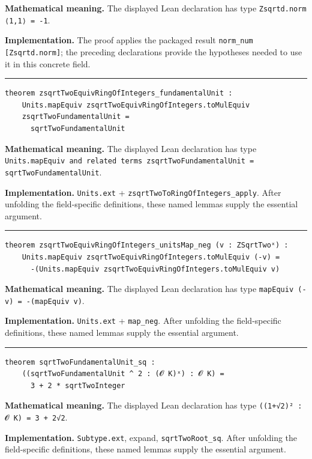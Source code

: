 \documentclass[UTF8,a4paper,11pt,fontset=fandol]{ctexart}
\theoremstyle{definition}
\newcommand{\statementsep}{\par\medskip\hrule\medskip}
\begin{document}
\noindent\textbf{Mathematical meaning.} The displayed Lean declaration has type \texttt{Zsqrtd.\allowbreak{}norm ⟨1,1⟩ = -1}.\par
\noindent\textbf{Implementation.} The proof applies the packaged result \texttt{norm\_\allowbreak{}num [Zsqrtd.\allowbreak{}norm]}; the preceding declarations provide the hypotheses needed to use it in this concrete field.\par
\statementsep
\begin{verbatim}
theorem zsqrtTwoEquivRingOfIntegers_fundamentalUnit :
    Units.mapEquiv zsqrtTwoEquivRingOfIntegers.toMulEquiv
    zsqrtTwoFundamentalUnit =
      sqrtTwoFundamentalUnit
\end{verbatim}
\noindent\textbf{Mathematical meaning.} The displayed Lean declaration has type \texttt{Units.\allowbreak{}mapEquiv and related terms zsqrtTwoFundamentalUnit = sqrtTwoFundamentalUnit}.\par
\noindent\textbf{Implementation.} \texttt{Units.\allowbreak{}ext} + \texttt{zsqrtTwoToRingOfIntegers\_\allowbreak{}apply}. After unfolding the field-specific definitions, these named lemmas supply the essential argument.\par
\statementsep
\begin{verbatim}
theorem zsqrtTwoEquivRingOfIntegers_unitsMap_neg (v : ZSqrtTwoˣ) :
    Units.mapEquiv zsqrtTwoEquivRingOfIntegers.toMulEquiv (-v) =
      -(Units.mapEquiv zsqrtTwoEquivRingOfIntegers.toMulEquiv v)
\end{verbatim}
\noindent\textbf{Mathematical meaning.} The displayed Lean declaration has type \texttt{mapEquiv (-v) = -(mapEquiv v)}.\par
\noindent\textbf{Implementation.} \texttt{Units.\allowbreak{}ext} + \texttt{map\_\allowbreak{}neg}. After unfolding the field-specific definitions, these named lemmas supply the essential argument.\par
\statementsep
\begin{verbatim}
theorem sqrtTwoFundamentalUnit_sq :
    ((sqrtTwoFundamentalUnit ^ 2 : (𝓞 K)ˣ) : 𝓞 K) =
      3 + 2 * sqrtTwoInteger
\end{verbatim}
\noindent\textbf{Mathematical meaning.} The displayed Lean declaration has type \texttt{((1+√2)² : 𝓞 K) = 3 + 2√2}.\par
\noindent\textbf{Implementation.} \texttt{Subtype.\allowbreak{}ext}, expand, \texttt{sqrtTwoRoot\_\allowbreak{}sq}. After unfolding the field-specific definitions, these named lemmas supply the essential argument.\par
\end{document}
